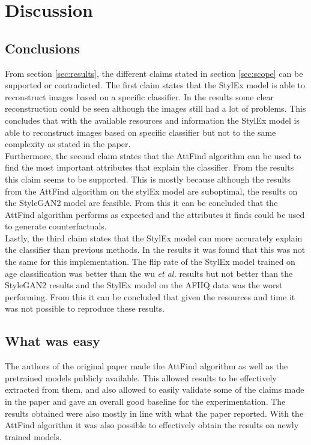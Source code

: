 \section{Discussion}
\label{sec:discussion}

\subsection{Conclusions}
From section \ref{sec:results}, the different claims stated in section \ref{sec:scope} can be supported or contradicted. The first claim states that the StylEx model is able to reconstruct images based on a specific classifier. In the results some clear reconstruction could be seen although the images still had a lot of problems. This concludes that with the available resources and information the StylEx model is able to reconstruct images based on specific classifier but not to the same complexity as stated in the paper. \\
Furthermore, the second claim states that the AttFind algorithm can be used to find the most important attributes that explain the classifier. From the results this claim seems to be supported. This is mostly because although the results from the AttFind algorithm on the stylEx model are suboptimal, the results on the StyleGAN2 model are feasible. From this it can be concluded that the AttFind algorithm performs as expected and the attributes it finds could be used to generate counterfactuals. \\
Lastly, the third claim states that the StylEx model can more accurately explain the classifier than previous methods. In the results it was found that this was not the same for this implementation. The flip rate of the StylEx model trained on age classification was better than the wu \textit{et al.} results but not better than the StyleGAN2 results and the StylEx model on the AFHQ data was the worst performing. From this it can be concluded that given the resources and time it was not possible to reproduce these results.

\subsection{What was easy}
The authors of the original paper made the AttFind algorithm as well as the pretrained models publicly available. This allowed results to be effectively extracted from them, and also allowed to easily validate some of the claims made in the paper and gave an overall good baseline for the experimentation. The results obtained were also mostly in line with what the paper reported. With the AttFind algorithm it was also possible to effectively obtain the results on newly trained models.

